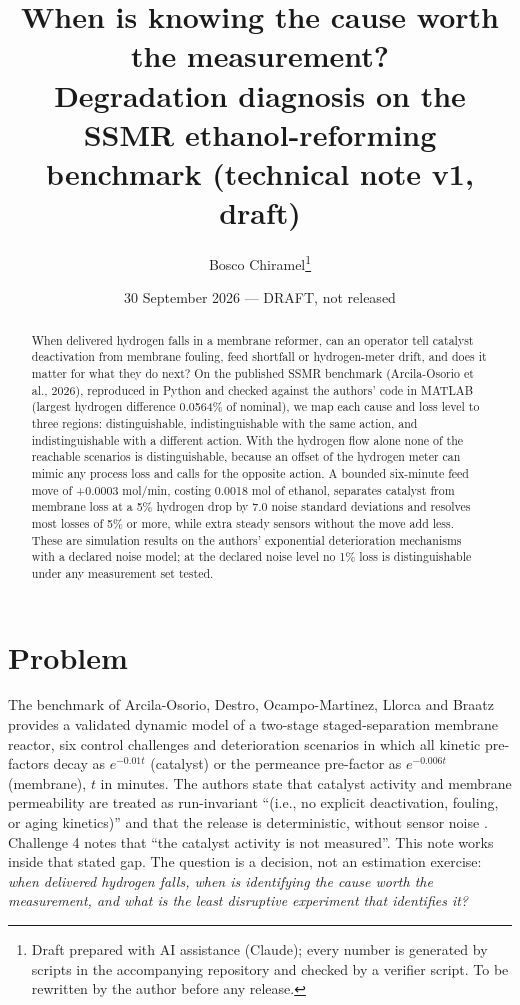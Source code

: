 \documentclass[10pt,a4paper]{article}
\title{When is knowing the cause worth the measurement?\\\large Degradation diagnosis on the SSMR ethanol-reforming benchmark (technical note v1, draft)}
\author{Bosco Chiramel\thanks{Draft prepared with AI assistance (Claude); every number is generated by scripts in the accompanying repository and checked by a verifier script. To be rewritten by the author before any release.}}
\date{30 September 2026 --- DRAFT, not released}
\begin{document}
\maketitle
\begin{abstract}\noindent
When delivered hydrogen falls in a membrane reformer, can an operator tell catalyst deactivation from membrane fouling, feed shortfall or hydrogen-meter drift, and does it matter for what they do next?
On the published SSMR benchmark (Arcila-Osorio et al., 2026), reproduced in Python and checked against the authors' code in MATLAB (largest hydrogen difference 0.0564\% of nominal), we map each cause and loss level to three regions: distinguishable, indistinguishable with the same action, and indistinguishable with a different action.
With the hydrogen flow alone none of the reachable scenarios is distinguishable, because an offset of the hydrogen meter can mimic any process loss and calls for the opposite action.
A bounded six-minute feed move of +0.0003 mol/min, costing 0.0018 mol of ethanol, separates catalyst from membrane loss at a 5\% hydrogen drop by 7.0 noise standard deviations and resolves most losses of 5\% or more, while extra steady sensors without the move add less.
These are simulation results on the authors' exponential deterioration mechanisms with a declared noise model; at the declared noise level no 1\% loss is distinguishable under any measurement set tested.
\end{abstract}

\section{Problem}
The benchmark of Arcila-Osorio, Destro, Ocampo-Martinez, Llorca and Braatz \cite{bench} provides a validated dynamic model of a two-stage staged-separation membrane reactor, six control challenges and deterioration scenarios in which all kinetic pre-factors decay as $e^{-0.01t}$ (catalyst) or the permeance pre-factor as $e^{-0.006t}$ (membrane), $t$ in minutes. The authors state that catalyst activity and membrane permeability are treated as run-invariant ``(i.e., no explicit deactivation, fouling, or aging kinetics)'' and that the release is deterministic, without sensor noise \cite{bench}. Challenge 4 notes that ``the catalyst activity is not measured''. This note works inside that stated gap. The question is a decision, not an estimation exercise: \emph{when delivered hydrogen falls, when is identifying the cause worth the measurement, and what is the least disruptive experiment that identifies it?}
\end{document}

